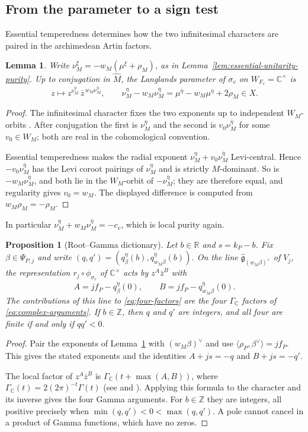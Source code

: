 \documentclass[12pt]{amsart}
\numberwithin{equation}{section}
\theoremstyle{plain}
\newtheorem{lemma}[theorem]{Lemma}
\newtheorem{proposition}[theorem]{Proposition}
\theoremstyle{definition}
\theoremstyle{remark}
\renewcommand{\bar}{\overline}
\newcommand{\C}{\mathbb C}
\newcommand{\Z}{\mathbb{Z}}
\begin{document}
\subsection{From the parameter to a sign test}
Essential temperedness determines how the two infinitesimal characters are paired in the archimedean Artin factors.
\begin{lemma}\label{lem:complex-alignment}
Write $\nu_M^\xi=-w_M(\mu^\xi+\rho_M)$, as in Lemma~\ref{lem:essential-unitarity-purity}. Up to conjugation in $\widehat M$, the Langlands parameter of $\sigma_v$ on $W_{F_v}=\C^\times$ is 
\[
 z\longmapsto z^{\nu_M^\eta}\,\bar z^{\,w_M\nu_M^{\bar\eta}},
 \qquad
 \nu_M^\eta-w_M\nu_M^{\bar\eta}
   =\mu^{\bar\eta}-w_M\mu^\eta+2\rho_M\in X.
\]
\end{lemma}
\begin{proof}
The infinitesimal character fixes the two exponents up to independent $W_M$-orbits \cite[\S11, Cor.~3]{NairPrasad2021}. After conjugation the first is $\nu_M^\eta$ and the second is $v_0\nu_M^{\bar\eta}$ for some $v_0\in W_M$; both are real in the cohomological convention.

Essential temperedness makes the radial exponent $\nu_M^\eta+v_0\nu_M^{\bar\eta}$ Levi-central. Hence $-v_0\nu_M^{\bar\eta}$ has the Levi coroot pairings of $\nu_M^\eta$ and is strictly $M$-dominant. So is $-w_M\nu_M^{\bar\eta}$, and both lie in the $W_M$-orbit of $-\nu_M^{\bar\eta}$; they are therefore equal, and regularity gives $v_0=w_M$. The displayed difference is computed from $w_M\rho_M=-\rho_M$. 
\end{proof}

In particular $\nu_M^\eta+w_M\nu_M^{\bar\eta}=-c_v$, which is local purity again. 

\begin{proposition}[Root--Gamma dictionary]\label{prop:complex-dictionary}
Let $b\in\mathbb R$ and $s=k_P-b$. Fix $\beta\in\Psi_{P,j}$ and write $(q,q')=(q^\eta_\beta(b),q^{\bar\eta}_{w_M\beta}(b))$. On the line $\widehat{\mathfrak g}_{(w_M\beta)^\vee}$ of $V_j$, the representation $r_j\circ\phi_{\sigma_v}$ of $\C^\times$ acts by $z^A\bar z^B$ with 
\[
 A=jf_P-q^\eta_\beta(0),\qquad B=jf_P-q^{\bar\eta}_{w_M\beta}(0).
\]
The contributions of this line to \eqref{eq:four-factors} are the four $\Gamma_\C$ factors of \eqref{eq:complex-arguments}. If $b\in\Z$, then $q$ and $q'$ are integers, and all four are finite if and only if $qq'<0$.
\end{proposition}
\begin{proof}
Pair the exponents of Lemma~\ref{lem:complex-alignment} with $(w_M\beta)^\vee$ and use $\langle\rho_P,\beta^\vee\rangle=jf_P$. This gives the stated exponents and the identities $A+js=-q$ and $B+js=-q'$.

The local factor of $z^A\bar z^B$ is $\Gamma_\C(t+\max(A,B))$, where $\Gamma_\C(t)=2(2\pi)^{-t}\Gamma(t)$ (see \cite[p.~13]{Tate1979} and \cite[(4.6)]{Knapp1994}). Applying this formula to the character and its inverse gives the four Gamma arguments. For $b\in\Z$ they are integers, all positive precisely when $\min(q,q')<0<\max(q,q')$. A pole cannot cancel in a product of Gamma functions, which have no zeros.
\end{proof}
\end{document}
